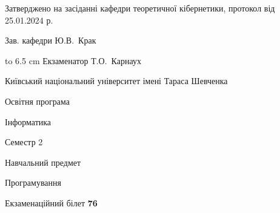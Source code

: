 \documentclass[12pt, ukrainian]{article}
\begin{document}
{\smallskip\smallskip \begin {scriptsize} Затверджено на засіданні кафедри теоретичної кібернетики, протокол   від   25.01.2024 р.\par\smallskip\smallskip\smallskip\smallskip
{\parbox {6.5 cm} {Зав. кафедри \dotfill Ю.В.~Крак}}\hspace {0.7cm} {\hbox to 6.5 cm { Екзаменатор \dotfill Т.О.~Карнаух}} \end{scriptsize}}
\newpage
{{\begin {scriptsize}\par
{ \center  Київський національний університет імені Тараса Шевченка \par}
{\parbox {5 cm}{Освітня програма \hfill}{\parbox {7 cm}{Інформатика\hfill}}\parbox {6 cm}{\hfill Семестр 2}}\par
{\parbox {5 cm} {Навчальний предмет \hfill}\parbox {7 cm}{Програмування \hfill}\parbox {6cm}{\hfill}\par}\vspace{-15pt} \end{scriptsize}}{\center Екзаменаційний білет \No \textbf { 76 }\par}}
\end{document}
